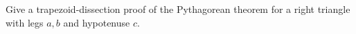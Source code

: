 Give a trapezoid-dissection proof of the Pythagorean theorem for a right triangle with legs $a,b$ and hypotenuse $c$.

